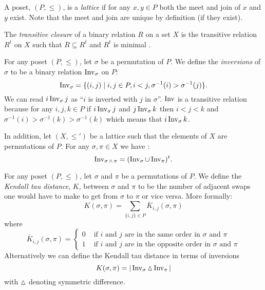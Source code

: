 	\begin{definition}
		\label{lattice-definition}
		A poset, $(P, \le)$, is a \emph{lattice} if for any $x, y \in P$ both the meet and join of $x$ and $y$ exist. Note that the meet and join are unique by definition (if they exist).
	\end{definition}

	\begin{definition}
		The \emph{transitive closure} of a binary relation $R$ on a set $X$ is the transitive relation $R^t$ on $X$ such that $R \subseteq R^t$ and $R^t$ is minimal \cite[p. 337]{lidl1998applied}.
	\end{definition}

	\begin{definition}
		\label{inversion-definition}
		For any poset $(P, \le)$, let $\sigma$ be a permutation of $P$. We define the \emph{inversions} of $\sigma$ to be a binary relation $\operatorname{Inv}_{\sigma}$ on $P$:
		\[
			\operatorname{Inv}_{\sigma} = \{(i,j) \mid i, j \in P, i < j, \sigma^{-1}(i) > \sigma^{-1}(j)\}.
		\]
		We can read $i \operatorname{Inv}_{\sigma} j$ as ``$i$ is inverted with $j$ in $\sigma$''. $\operatorname{Inv}$ is a transitive relation because for any $i,j,k \in P$ if $i \operatorname{Inv}_{\sigma} j$ and $j \operatorname{Inv}_{\sigma} k$ then $i < j < k$ and $\sigma^{-1}(i) > \sigma^{-1}(k) > \sigma^{-1}(k)$ which means that $i \operatorname{Inv}_{\sigma} k$.

		In addition, let $(X, \le')$ be a lattice such that the elements of $X$ are permutations of $P$. For any $\sigma, \pi \in X$ we have \cite{markowsky1994permutation}:
		\[
			\operatorname{Inv}_{\sigma \operatorname{\wedge} \pi} = (\operatorname{Inv}_{\sigma} \cup \operatorname{Inv}_{\pi})^t.
		\]
	\end{definition}

	\begin{definition}
		\label{kendall-tau-definition}
		For any poset $(P, \le)$, let $\sigma$ and $\pi$ be a permutations of $P$. We define the \emph{Kendall tau distance}, $K$, between $\sigma$ and $\pi$ to be the number of adjacent swaps one would have to make to get from $\sigma$ to $\pi$ or vice versa. More formally:
		\[
			K(\sigma, \pi) = \sum_{\{i, j\} \in P} \overline{K}_{i, j}(\sigma, \pi)
		\]
		where
		\[
			\overline{K}_{i,j}(\sigma, \pi) =
				\begin{cases}
					0 & \textrm{ if } i \textrm{ and } j \textrm{ are in the same order in } \sigma \textrm{ and } \pi \\
					1 & \textrm{ if } i \textrm{ and } j \textrm{ are in the opposite order in } \sigma \textrm{ and } \pi
				\end{cases}
		\]
		Alternatively we can define the Kendall tau distance in terms of inversions
		\[
			K(\sigma, \pi) = |\operatorname{Inv}_{\sigma} \operatorname{\vartriangle} \operatorname{Inv}_{\pi}|
		\]
		with $\operatorname{\vartriangle}$ denoting symmetric difference.
	\end{definition}

